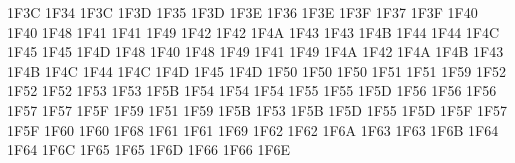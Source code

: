 \setcclcucx 1F3C 1F34 1F3C %
\setcclcucx 1F3D 1F35 1F3D %
\setcclcucx 1F3E 1F36 1F3E %
\setcclcucx 1F3F 1F37 1F3F %
\setcclcucx 1F40 1F40 1F48 %
\setcclcucx 1F41 1F41 1F49 %
\setcclcucx 1F42 1F42 1F4A %
\setcclcucx 1F43 1F43 1F4B %
\setcclcucx 1F44 1F44 1F4C %
\setcclcucx 1F45 1F45 1F4D %
\setcclcucx 1F48 1F40 1F48 %
\setcclcucx 1F49 1F41 1F49 %
\setcclcucx 1F4A 1F42 1F4A %
\setcclcucx 1F4B 1F43 1F4B %
\setcclcucx 1F4C 1F44 1F4C %
\setcclcucx 1F4D 1F45 1F4D %
\setcclcucx 1F50 1F50 1F50 %
\setcclcucx 1F51 1F51 1F59 %
\setcclcucx 1F52 1F52 1F52 %
\setcclcucx 1F53 1F53 1F5B %
\setcclcucx 1F54 1F54 1F54 %
\setcclcucx 1F55 1F55 1F5D %
\setcclcucx 1F56 1F56 1F56 %
\setcclcucx 1F57 1F57 1F5F %
\setcclcucx 1F59 1F51 1F59 %
\setcclcucx 1F5B 1F53 1F5B %
\setcclcucx 1F5D 1F55 1F5D %
\setcclcucx 1F5F 1F57 1F5F %
\setcclcucx 1F60 1F60 1F68 %
\setcclcucx 1F61 1F61 1F69 %
\setcclcucx 1F62 1F62 1F6A %
\setcclcucx 1F63 1F63 1F6B %
\setcclcucx 1F64 1F64 1F6C %
\setcclcucx 1F65 1F65 1F6D %
\setcclcucx 1F66 1F66 1F6E %
